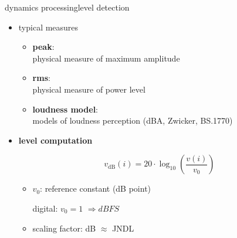 \begin{frame}{dynamics processing}{level detection}
	\vspace{-5mm}
    \begin{itemize}
        \item typical measures
    \begin{itemize}
		\item	\textbf{peak}:\\ physical measure of maximum amplitude
		\item	\textbf{rms}:\\ physical measure of power level
		\item	\textbf{loudness model}:\\ models of loudness perception (dBA, Zwicker, BS.1770)
		\vspace{5mm}
    \end{itemize}
    \pause
    \item   \textbf{level computation}

		\begin{equation*}
			v_\mathrm{dB}(i) = 20\cdot\log_{10}\left(\frac{v(i)}{v_0}\right)
		\end{equation*}
	
		\pause
		\begin{itemize}
			\item	$v_0$: reference constant (\unit[0]{dB} point)
			
					digital: $v_0 = 1$ $\Rightarrow \unit{dBFS}$
			\item	scaling	factor: \unit[1]{dB} $\approx$ JNDL
		\end{itemize}

	\end{itemize}
\end{frame}
